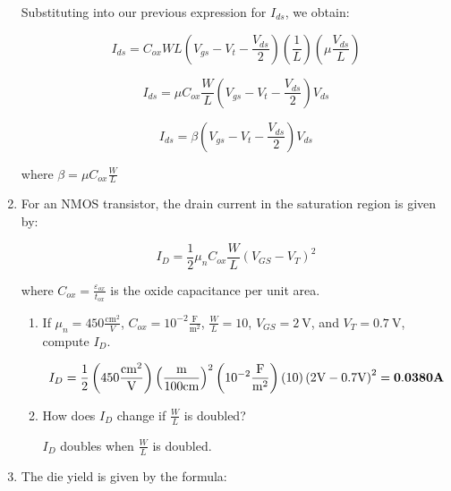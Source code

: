 \documentclass[fleqn]{article}
\begin{document}
\begin{enumerate}
		Substituting into our previous expression for $I_{ds}$, we obtain:
		
		\begin{equation*}
			I_{ds} = C_{ox}WL\left(V_{gs} - V_t - \frac{V_{ds}}{2}\right)\left(\frac{1}{L}\right)\left(\mu\frac{V_{ds}}{L}\right)
		\end{equation*}
		
		\begin{equation*}
			I_{ds} = \mu{C_{ox}}\frac{W}{L}\left(V_{gs} - V_t - \frac{V_{ds}}{2}\right)V_{ds}
		\end{equation*}
		
		\begin{equation*}
			I_{ds} = \beta\left(V_{gs} - V_t - \frac{V_{ds}}{2}\right)V_{ds}
		\end{equation*}
		
		where $\beta = \mu{C_{ox}}\frac{W}{L}$
		
		\item For an NMOS transistor, the drain current in the saturation region is given by:
		
		\begin{equation*}
			I_D = \frac{1}{2}{\mu_n}{C_{ox}}\frac{W}{L}(V_{GS}-V_{T})^2
		\end{equation*}
		
		where $C_{ox} = \frac{\varepsilon_{ox}}{t_{ox}}$ is the oxide capacitance per unit area.
		
		\begin{enumerate}
			\item If $\mu_n = 450 \frac{\text{cm}^2}{V}$, $C_{ox} = 10^{-2}\frac{\text{F}}{\text{m}^2}$, $\frac{W}{L} = 10$, $V_{GS} = 2\ \text{V}$, and $V_T = 0.7\ \text{V}$, compute $I_D$.
			
			\begin{equation*}
				I_D = \frac{1}{2}\left(450\frac{\text{cm}^2}{\text{V}}\right)\left(\frac{\text{m}}{100\text{cm}}\right)^2\left(10^{-2}\frac{\text{F}}{\text{m}^2}\right)(10)\left(2\text{V} - 0.7\text{V}\right)^2 = \mathbf{0.0380 \textbf{\text{A}}}
			\end{equation*}
			
			\item How does $I_D$ change if $\frac{W}{L}$ is doubled?
			
			$I_D$ doubles when $\frac{W}{L}$ is doubled.
			
		\end{enumerate}
		
		\item The die yield is given by the formula:
		

\end{enumerate}
\end{document}
